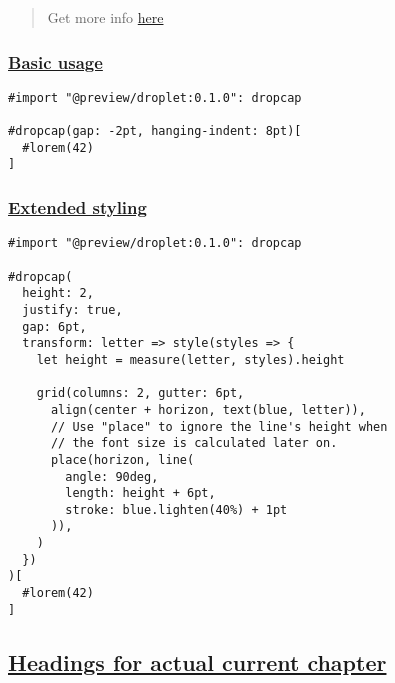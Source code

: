 \begin{quote}
Get more info
\href{https://github.com/EpicEricEE/typst-plugins/tree/master/droplet}{here}
\end{quote}

\subsubsection{\texorpdfstring{\hyperref[basic-usage]{Basic
usage}}{Basic usage}}\label{basic-usage}

\begin{verbatim}
#import "@preview/droplet:0.1.0": dropcap

#dropcap(gap: -2pt, hanging-indent: 8pt)[
  #lorem(42)
]
\end{verbatim}

\pandocbounded{}

\subsubsection{\texorpdfstring{\hyperref[extended-styling]{Extended
styling}}{Extended styling}}\label{extended-styling}

\begin{verbatim}
#import "@preview/droplet:0.1.0": dropcap

#dropcap(
  height: 2,
  justify: true,
  gap: 6pt,
  transform: letter => style(styles => {
    let height = measure(letter, styles).height

    grid(columns: 2, gutter: 6pt,
      align(center + horizon, text(blue, letter)),
      // Use "place" to ignore the line's height when
      // the font size is calculated later on.
      place(horizon, line(
        angle: 90deg,
        length: height + 6pt,
        stroke: blue.lighten(40%) + 1pt
      )),
    )
  })
)[
  #lorem(42)
]
\end{verbatim}

\pandocbounded{}

\subsection{\texorpdfstring{\hyperref[headings-for-actual-current-chapter]{Headings
for actual current
chapter}}{Headings for actual current chapter}}\label{headings-for-actual-current-chapter}

